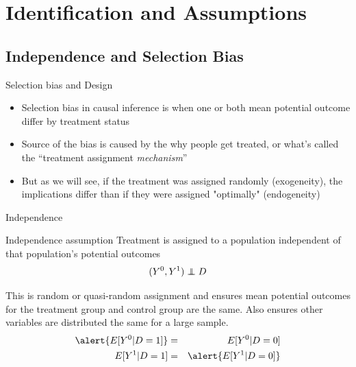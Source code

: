 \documentclass{beamer}
\newcommand\independent{\protect\mathpalette{\protect\independenT}{\perp}}
\def\independenT#1#2{\mathrel{\rlap{$#1#2$}\mkern2mu{#1#2}}}
\begin{document}
\section{Identification and Assumptions}

\subsection{Independence and Selection Bias}



\begin{frame}{Selection bias and Design}

\begin{itemize}
\item Selection bias in causal inference is when one or both mean potential outcome differ by treatment status
\item Source of the bias is caused by the why people get treated, or what's called the ``treatment assignment \emph{mechanism}''
\item But as we will see, if the treatment was assigned randomly (exogeneity), the implications differ than if they were assigned "optimally" (endogeneity)
\end{itemize}

\end{frame}


\begin{frame}{Independence}


  \begin{block}{Independence assumption}
    Treatment is assigned to a population independent of that population's potential outcomes  $$(Y^0,Y^1)\independent{D}$$
  \end{block}
  This is random or quasi-random assignment and ensures mean potential outcomes for the treatment group and control group are the same.  Also ensures other variables are distributed the same for a large sample.
  \begin{eqnarray*}
    \alert{E[Y^0|D=1]} &=& E[Y^0 | D=0] \\
    E[Y^1|D=1] &=& \alert{E[Y^1 | D=0]}
  \end{eqnarray*}
\end{frame}
\end{document}
